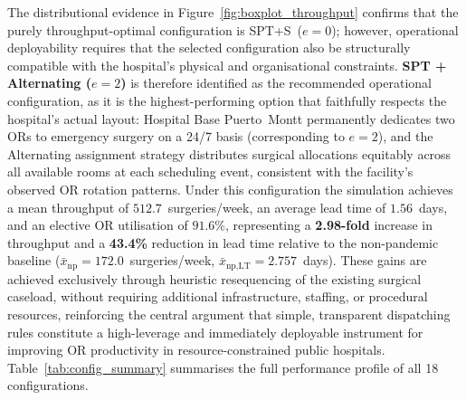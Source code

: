 \documentclass[sn-mathphys-num]{sn-jnl}
\begin{document}
The distributional evidence in Figure~\ref{fig:boxplot_throughput}
confirms that the purely throughput-optimal configuration is
SPT+S~($e=0$); however, operational deployability requires that the
selected configuration also be structurally compatible with the
hospital's physical and organisational constraints.
\textbf{SPT + Alternating ($e = 2$)} is therefore identified as the
recommended operational configuration, as it is the highest-performing
option that faithfully respects the hospital's actual layout: Hospital
Base Puerto~Montt permanently dedicates two ORs to emergency surgery on
a 24/7 basis (corresponding to $e = 2$), and the Alternating assignment
strategy distributes surgical allocations equitably across all available
rooms at each scheduling event, consistent with the facility's observed
OR rotation patterns.
Under this configuration the simulation achieves a mean throughput of
$512.7$~surgeries/week, an average lead time of $1.56$~days, and an
elective OR utilisation of $91.6\%$, representing a
\textbf{2.98-fold} increase in throughput and a \textbf{43.4\%}
reduction in lead time relative to the non-pandemic baseline
($\bar{x}_\text{np} = 172.0$~surgeries/week,
$\bar{x}_\text{np,LT} = 2.757$~days).
These gains are achieved exclusively through heuristic resequencing of
the existing surgical caseload, without requiring additional
infrastructure, staffing, or procedural resources, reinforcing the
central argument that simple, transparent dispatching rules constitute
a high-leverage and immediately deployable instrument for improving OR
productivity in resource-constrained public hospitals.
Table~\ref{tab:config_summary} summarises the full performance profile
of all 18 configurations.
\end{document}
